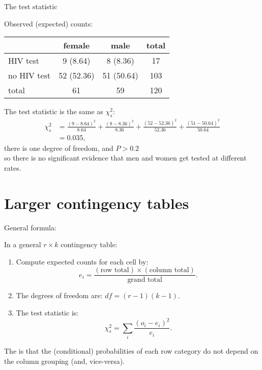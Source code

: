 \begin{frame}{The test statistic}

    Observed (\alert{expected}) counts:
        \begin{center}
            \begin{tabular}{lcc|c}
                & female & male & total \\
                \hline
                HIV test & 9 \alert{(8.64)} & 8 \alert{(8.36)} & 17 \\
                no HIV test & 52 \alert{(52.36)} & 51 \alert{(50.64)} & 103 \\
                \hline
                total & 61 & 59 & 120 \\
            \end{tabular}
        \end{center}

    \vspace{2em}

    The test statistic is the \alert{same} as $\chi^2_s$:
    \begin{align*}
        \chi^2_s &= \frac{(9 - 8.64)^2}{8.64} + 
            \frac{(8 - 8.36)^2}{8.36} + 
            \frac{(52 - 52.36)^2}{52.36} + 
            \frac{(51 - 50.64)^2}{50.64} \\
          &= 0.035,
      \end{align*}
    there is \alert{one} {degree of freedom}, and $P > 0.2$ \\
    so there is no significant evidence that men and women get tested at different rates.


\end{frame}

\section{Larger contingency tables}

\begin{frame}{General formula:}

    In a general $r \times k$ contingency table:
    \begin{enumerate}
        \item Compute expected counts for each cell by:
            \[ e_i = \frac{ (\text{row total}) \times (\text{column total}) }{ \text{grand total} } . \]
        \item The degrees of freedom are: $df = (r-1)(k-1)$.
        \item The test statistic is:
            \[ \chi^2_s = \sum_i \frac{ ( o_i - e_i )^2 }{ e_i } . \]
    \end{enumerate}

    \vspace{2em}

    The  is that the (conditional) probabilities of each row category
    do not depend on the column grouping
    (and, vice-versa).

\end{frame}

